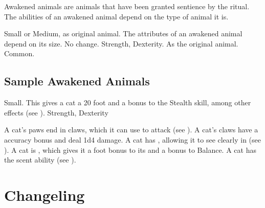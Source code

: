   Awakened animals are animals that have been granted sentience by the  ritual.
  The abilities of an awakened animal depend on the type of animal it is.

   Small or Medium, as original animal.
   The attributes of an awakened animal depend on its size.
   No change.
    Strength,  Dexterity.
   As the original animal.
   Common.

  \subsection{Sample Awakened Animals}


     Small. This gives a cat a 20 foot  and a  bonus to the Stealth skill, among other effects (see ).
      Strength,  Dexterity
    \begin{itemize}
       A cat's paws end in claws, which it can use to attack (see ). A cat's claws have a  accuracy bonus and deal 1d4 damage.
       A cat has , allowing it to see clearly in  (see ).
       A cat is , which gives it a  foot bonus to its  and a  bonus to Balance.
       A cat has the scent ability (see ).
    \end{itemize}

\section{Changeling}

